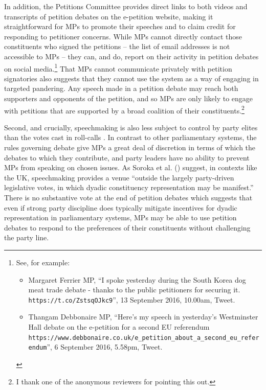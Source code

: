 \documentclass[12pt]{article}
\begin{document}
In addition, the Petitions Committee provides direct links to both videos and transcripts of petition debates on the e-petition website, making it straightforward for MPs to promote their speeches and to claim credit for responding to petitioner concerns. While MPs cannot directly contact those constituents who signed the petitions -- the list of email addresses is not accessible to MPs -- they can, and do, report on their activity in petition debates on social media.\footnote{See, for example: 
\begin{itemize}
\item Margaret Ferrier MP, ``I spoke yesterday during the South Korea dog meat trade debate - thanks to the public petitioners for securing it. \texttt{https://t.co/ZstsqOJkc9}'', 13 September 2016, 10.00am, Tweet.
\item Thangam Debbonaire MP, ``Here's my speech in yesterday's Westminster Hall debate on the e-petition for a second EU referendum \texttt{https://www.debbonaire.co.uk/e\_petition\_about\_a\_second\_eu\_referendum}'', 6 September 2016, 5.58pm, Tweet. 
\end{itemize}
} That MPs cannot communicate privately with petition signatories also suggests that they cannot use the system as a way of engaging in targeted pandering. Any speech made in a petition debate may reach both supporters and opponents of the petition, and so MPs are only likely to engage with petitions that are supported by a broad coalition of their constituents.\footnote{I thank one of the anonymous reviewers for pointing this out.} 

Second, and crucially, speechmaking is also less subject to control by party elites than the votes cast in roll-calls \citep{proksch2012institutional}. In contrast to other parliamentary systems, the rules governing debate give MPs a great deal of discretion in terms of which the debates to which they contribute, and party leaders have no ability to prevent MPs from speaking on chosen issues. As Soroka et al. (\citeyear[567]{soroka2009constituency}) suggest, in contexts like the UK, speechmaking provides a venue ``outside the largely party-driven legislative votes, in which dyadic constituency representation may be manifest.'' There is no substantive vote at the end of petition debates which suggests that even if strong party discipline does typically mitigate incentives for dyadic representation in parliamentary systems, MPs may be able to use petition debates to respond to the preferences of their constituents without challenging the party line. 
\end{document}
